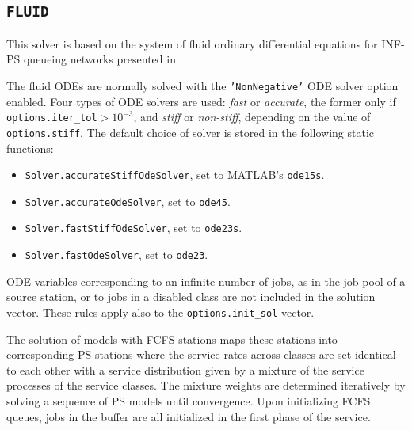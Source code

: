 \subsection{\texttt{FLUID}}
This solver is based on the system of fluid ordinary differential equations for INF-PS queueing networks presented in \cite{PerC17}.

The fluid ODEs are normally solved with the \texttt{'NonNegative'} ODE solver option enabled. Four types of ODE solvers are used: \emph{fast} or \emph{accurate}, the former only if \texttt{options.iter\_tol}$> 10^{-3}$, and \emph{stiff} or \emph{non-stiff}, depending on the value of \texttt{options.stiff}. The default choice of solver is stored in the following static functions:
\begin{itemize}
\item \texttt{Solver.accurateStiffOdeSolver}, set to MATLAB's \texttt{ode15s}.
\item \texttt{Solver.accurateOdeSolver}, set to \texttt{ode45}.
\item \texttt{Solver.fastStiffOdeSolver}, set to \texttt{ode23s}.
\item \texttt{Solver.fastOdeSolver}, set to \texttt{ode23}.
\end{itemize}

ODE variables corresponding to an infinite number of jobs, as in the job pool of a source station, or to jobs in a disabled class are not included in the solution vector. These rules apply also to the \texttt{options.init\_sol} vector.

The solution of models with FCFS stations maps these stations into corresponding PS stations where the service rates across classes are set identical to each other with a service distribution given by a mixture of the service processes of the service classes. The mixture weights are determined iteratively by solving a sequence of PS models until convergence. Upon initializing FCFS queues, jobs in the buffer are all initialized in the first phase of the service.


